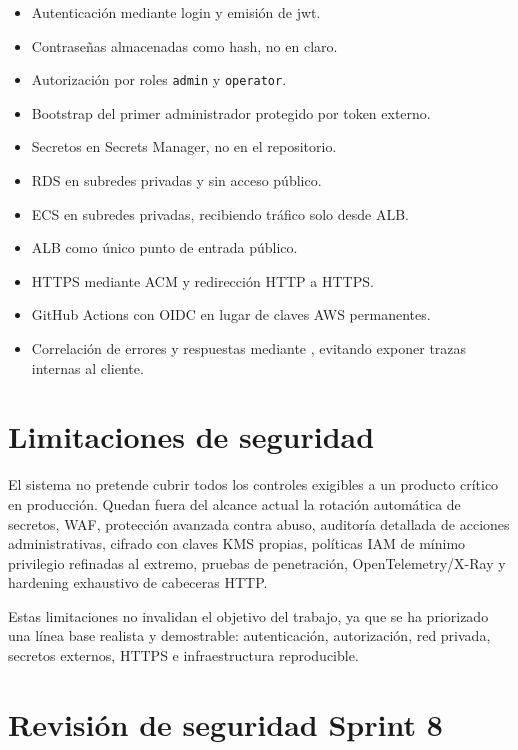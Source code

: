\begin{itemize}
  \item Autenticación mediante login y emisión de \acrshort{jwt}.
  \item Contraseñas almacenadas como hash, no en claro.
  \item Autorización por roles \texttt{admin} y \texttt{operator}.
  \item Bootstrap del primer administrador protegido por token externo.
  \item Secretos en Secrets Manager, no en el repositorio.
  \item RDS en subredes privadas y sin acceso público.
  \item ECS en subredes privadas, recibiendo tráfico solo desde ALB.
  \item ALB como único punto de entrada público.
  \item HTTPS mediante ACM y redirección HTTP a HTTPS.
  \item GitHub Actions con OIDC en lugar de claves AWS permanentes.
  \item Correlación de errores y respuestas mediante , evitando exponer trazas internas al cliente.
\end{itemize}

\section{Limitaciones de seguridad}
\label{sec:limitaciones-seguridad}

El sistema no pretende cubrir todos los controles exigibles a un producto crítico en producción. Quedan fuera del alcance actual la rotación automática de secretos, WAF, protección avanzada contra abuso, auditoría detallada de acciones administrativas, cifrado con claves KMS propias, políticas IAM de mínimo privilegio refinadas al extremo, pruebas de penetración, OpenTelemetry/X-Ray y hardening exhaustivo de cabeceras HTTP.

Estas limitaciones no invalidan el objetivo del trabajo, ya que se ha priorizado una línea base realista y demostrable: autenticación, autorización, red privada, secretos externos, HTTPS e infraestructura reproducible.

\section{Revisión de seguridad Sprint 8}
\label{sec:revision-seguridad-sprint8}

